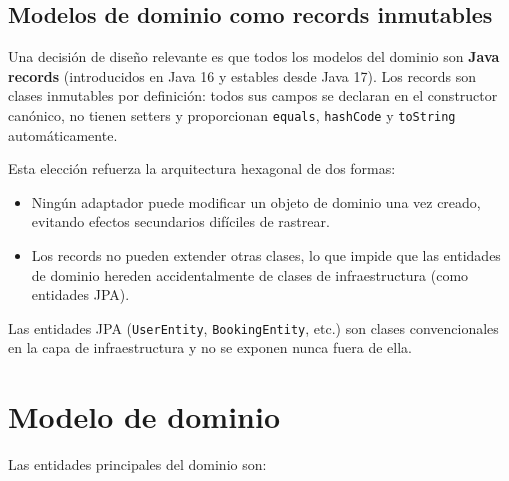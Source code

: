 \subsection{Modelos de dominio como records inmutables}

Una decisión de diseño relevante es que todos los modelos del dominio son
\textbf{Java records} (introducidos en Java 16 y estables desde Java 17). Los
records son clases inmutables por definición: todos sus campos se declaran en el
constructor canónico, no tienen setters y proporcionan \texttt{equals},
\texttt{hashCode} y \texttt{toString} automáticamente.

Esta elección refuerza la arquitectura hexagonal de dos formas:
\begin{itemize}
  \item Ningún adaptador puede modificar un objeto de dominio una vez creado,
    evitando efectos secundarios difíciles de rastrear.
  \item Los records no pueden extender otras clases, lo que impide que las
    entidades de dominio hereden accidentalmente de clases de infraestructura
    (como entidades JPA).
\end{itemize}

Las entidades JPA (\texttt{UserEntity}, \texttt{BookingEntity}, etc.) son clases
convencionales en la capa de infraestructura y no se exponen nunca fuera de ella.

\section{Modelo de dominio}
\label{sec:modelo_dominio}

Las entidades principales del dominio son:

